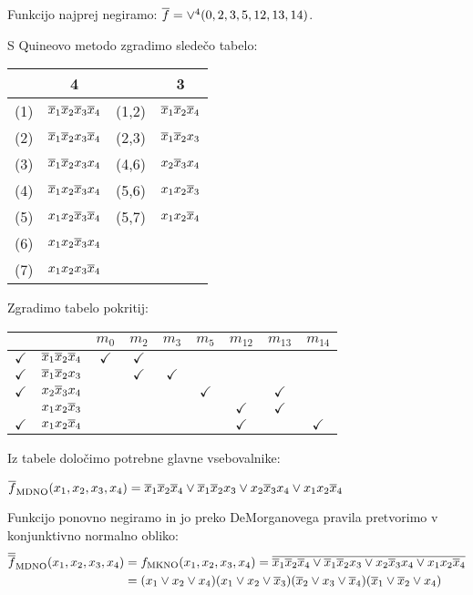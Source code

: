 \begin{resitev}
Funkcijo najprej negiramo:
$\overline f = \vee^4(0,2,3,5,12,13,14)$.

\bigskip
S Quineovo metodo zgradimo sledečo tabelo:

\begin{tabular}{c|c|cc}
& 4 & & 3 \\
\hline
(1) & \sout{$\overline x_1 \overline x_2 \overline x_3 \overline x_4$} & (1,2) & $\overline x_1 \overline x_2 \overline x_4$ \\
(2) & \sout{$\overline x_1 \overline x_2 x_3 \overline x_4$} & (2,3) & $\overline x_1 \overline x_2 x_3$ \\
(3) & \sout{$\overline x_1 \overline x_2 x_3 x_4$} & (4,6) & $x_2 \overline x_3 x_4$ \\
(4) & \sout{$\overline x_1 x_2 \overline x_3 x_4$} & (5,6) & $x_1 x_2 \overline x_3$ \\
(5) & \sout{$x_1 x_2 \overline x_3 \overline x_4$} & (5,7) & $x_1 x_2 \overline x_4$ \\
(6) & \sout{$x_1 x_2 \overline x_3 x_4$} && \\
(7) & \sout{$x_1 x_2 x_3 \overline x_4$} && \\
\end{tabular}

\bigskip
Zgradimo tabelo pokritij:

\begin{tabular}{cc|ccccccc}
& & $m_0$ & $m_2$ & $m_3$ & $m_5$ & $m_{12}$ & $m_{13}$ & $m_{14}$ \\
\hline
$\checkmark$ & $\overline x_1 \overline x_2 \overline x_4$ & $\checkmark$ & $\checkmark$ & & & & &  \\
\hline
$\checkmark$ & $\overline x_1 \overline x_2 x_3$ & & $\checkmark$ & $\checkmark$ & & & &  \\
\hline
$\checkmark$ & $x_2 \overline x_3 x_4$ & & & & $\checkmark$ & & $\checkmark$ &  \\
\hline
& $x_1 x_2 \overline x_3$ & & & & & $\checkmark$ & $\checkmark$ & \\
\hline
$\checkmark$ & $x_1 x_2 \overline x_4$ & & & & & $\checkmark$ & & $\checkmark$ \\
\hline
\end{tabular}

\bigskip
Iz tabele določimo potrebne glavne vsebovalnike:

$\overline f_{\text{MDNO}}(x_1,x_2,x_3,x_4) = \overline x_1 \overline x_2 \overline x_4 \vee \overline x_1 \overline x_2 x_3 \vee x_2 \overline x_3 x_4 \vee x_1 x_2 \overline x_4$

\bigskip
Funkcijo ponovno negiramo in jo preko DeMorganovega pravila pretvorimo v konjunktivno normalno obliko:
\begin{align*}
\overline{\overline f}_{\text{MDNO}}(x_1,x_2,x_3,x_4) &= f_{\text{MKNO}}(x_1,x_2,x_3,x_4) = \overline{\overline x_1 \overline x_2 \overline x_4 \vee \overline x_1 \overline x_2 x_3 \vee x_2 \overline x_3 x_4 \vee x_1 x_2 \overline x_4}  \\ &= (x_1 \vee x_2 \vee x_4)(x_1 \vee x_2 \vee \overline x_3)(\overline x_2 \vee x_3 \vee \overline x_4)(\overline x_1 \vee \overline x_2 \vee x_4)
\end{align*}


\end{resitev}

